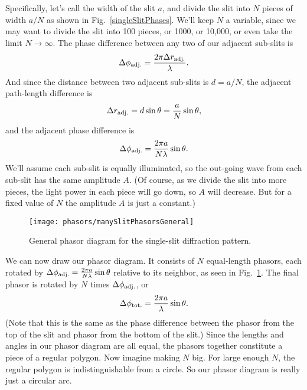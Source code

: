 Specifically, let's call the width of the slit $a$, and divide the
slit into $N$ pieces of width $a/N$
as shown in Fig.~\ref{singleSlitPhases}. We'll keep $N$ a variable, since
we may want to divide the slit into 100 pieces, or 1000, or 10,000, or
even take the limit $N\rightarrow\infty$.  The phase difference
between any two of our adjacent sub-slits is
\begin{equation}
\Delta\phi_{\rm adj.} = \frac{2\pi \Delta r_{\rm adj.}}{\lambda} .
\end{equation}
And since the distance between two adjacent sub-slits is $d=a/N$, 
the adjacent path-length difference is
\begin{equation}
\Delta r_{\rm adj.} = d\sin\theta= \frac{ a}{N} \sin\theta,
\end{equation} 
and the adjacent phase difference is
\begin{equation}
\Delta\phi_{\rm adj.} = \frac{2\pi a}{N\lambda}\sin\theta . 
\end{equation} 
We'll assume
each sub-slit is equally illuminated, so the out-going wave from each
sub-slit has the same amplitude $A$. (Of course, as we divide the slit
into more pieces, the light power in each piece will go down, so $A$
will decrease.  But for a fixed value of $N$ the amplitude $A$ is just
a constant.)

\begin{figure}[t]
\begin{center}\texttt{[image: phasors/manySlitPhasorsGeneral]}
\end{center}
\caption{\label{manySlitPhasorsGenFig}General phasor diagram for the
single-slit diffraction pattern.}
\end{figure}


We can now draw our phasor diagram. It consists of $N$ equal-length
phasors, each rotated by $\Delta\phi_{\rm adj.} = \frac{2\pi
a}{N\lambda}\sin\theta$ relative to its neighbor, as seen in 
Fig.~\ref{manySlitPhasorsGenFig}.  The final phasor is rotated
by $N$ times $\Delta\phi_{\rm adj.}$, or
\begin{equation}
\Delta\phi_{\rm tot.}=\frac{2\pi a}{\lambda}\sin\theta.
\end{equation}
(Note that this is
the same as the phase difference between the phasor from the top of
the slit and phasor from the bottom of the slit.)  Since the lengths
and angles in our phasor diagram are all equal, the phasors together
constitute a piece of a regular polygon.  Now imagine making $N$ big.
For large enough $N$, the regular polygon is indistinguishable from a
circle. So our phasor diagram is really just a circular arc.

